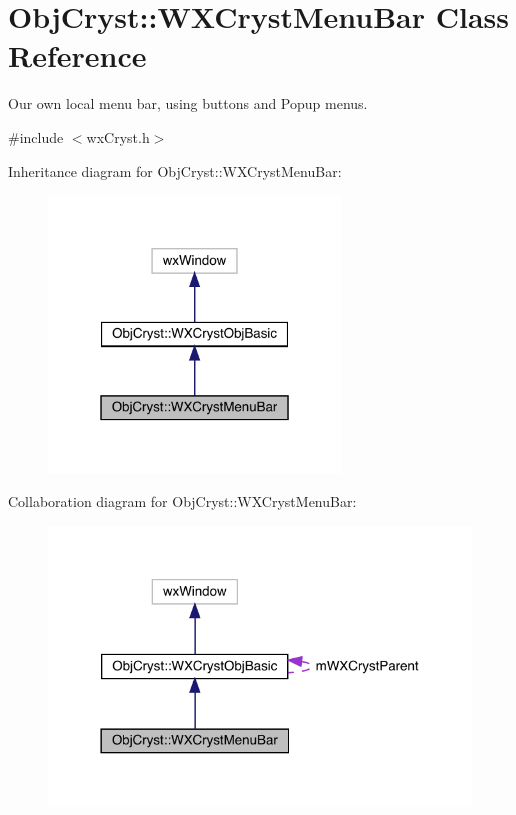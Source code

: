 \hypertarget{class_obj_cryst_1_1_w_x_cryst_menu_bar}{}\section{Obj\+Cryst\+::W\+X\+Cryst\+Menu\+Bar Class Reference}
\label{class_obj_cryst_1_1_w_x_cryst_menu_bar}


Our own local menu bar, using buttons and Popup menus.  




{\ttfamily \#include $<$wx\+Cryst.\+h$>$}



Inheritance diagram for Obj\+Cryst\+::W\+X\+Cryst\+Menu\+Bar\+:
\nopagebreak
\begin{figure}[H]
\begin{center}
\leavevmode
\includegraphics[width=220pt]{class_obj_cryst_1_1_w_x_cryst_menu_bar__inherit__graph}
\end{center}
\end{figure}


Collaboration diagram for Obj\+Cryst\+::W\+X\+Cryst\+Menu\+Bar\+:
\nopagebreak
\begin{figure}[H]
\begin{center}
\leavevmode
\includegraphics[width=318pt]{class_obj_cryst_1_1_w_x_cryst_menu_bar__coll__graph}
\end{center}
\end{figure}
